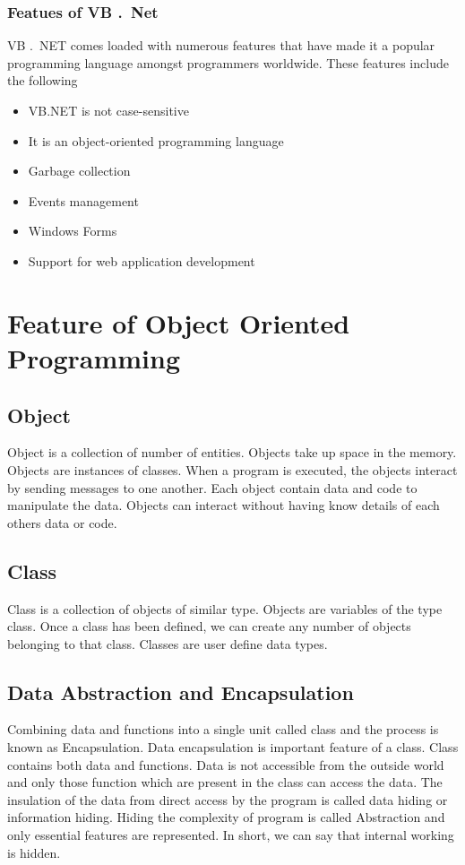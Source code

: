 {\subsubsection*{Featues of VB .\ Net}
VB .\ NET comes loaded with numerous features that have made it a popular programming language amongst programmers worldwide. These features include the following
\begin{multicols}{2}
\begin{itemize}
	\item VB.NET is not case-sensitive 
	\item It is an object-oriented programming language
	\item Garbage collection
	\item Events management
	\item Windows Forms
	\item Support for web application development
\end{itemize}
\end{multicols}


\section{Feature of Object Oriented Programming}

\subsection*{Object}	
Object is a collection of number of entities. Objects take up space in the memory. Objects are instances of classes. When a program is executed, the objects interact by sending messages to one another. Each object contain data and code to manipulate the data. Objects can interact without having know details of each others data or code.

\subsection*{Class}
Class is a collection of objects of similar type. Objects are variables of the type class. Once a class has been defined, we can create any number of objects belonging to that class. Classes are user define data types.
	 
\subsection*{Data Abstraction and Encapsulation}
 Combining data and functions into a single unit called class and the process is known as Encapsulation. Data encapsulation is important feature of a class. Class contains both data and functions. Data is not accessible from the outside world and only those function which are present in the class can access the data. The insulation of the data from direct access by the program is called data hiding or information hiding. Hiding the complexity of program is called Abstraction and only essential features are represented. In short, we can say that internal working is hidden.
	 
}
